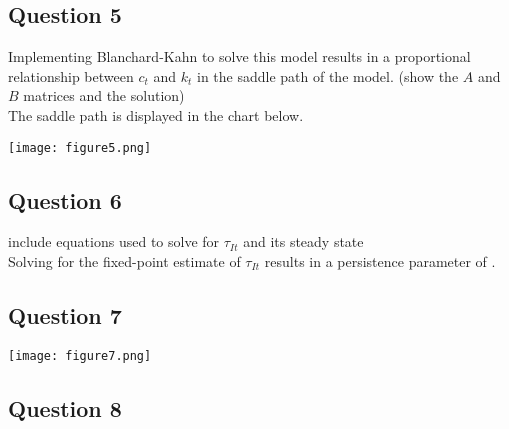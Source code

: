 \documentclass{article}
\newcommand{\red}[1]{{\color{red}#1}}
\begin{document}

\subsection*{Question 5}
Implementing Blanchard-Kahn to solve this model results in a proportional relationship between $c_t$ and $k_t$ in the saddle path of the model. \red{(show the $A$ and $B$ matrices and the solution)}
\medskip \\
The saddle path is displayed in the chart below.
\begin{center}\texttt{[image: figure5.png]}\end{center}



\subsection*{Question 6}
\red{include equations used to solve for $\tau_{It}$ and its steady state}
\medskip \\
Solving for the fixed-point estimate of $\tau_{It}$ results in a persistence parameter of .


\subsection*{Question 7}
\begin{center}\texttt{[image: figure7.png]}\end{center}



\subsection*{Question 8}


\end{document}
